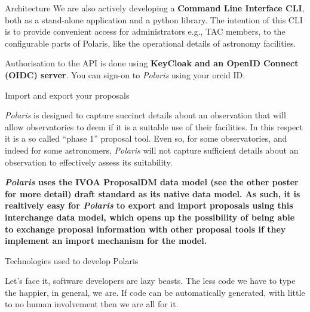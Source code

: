 \documentclass[final]{beamer}
\newlength{\colwidth}
\begin{document}
\begin{frame}[t]
\begin{columns}[t]
\begin{column}{\colwidth}
\begin{block}{Architecture}
                    We are also actively developing a \textbf{Command Line Interface CLI}, both as a stand-alone application and
                    a python library. The intention of this CLI is to provide convenient access
                    for administrators e.g., TAC members, to the configurable parts of Polaris, like the operational
                    details of astronomy facilities.

                    Authorisation to the API is done using \textbf{KeyCloak and an OpenID Connect (OIDC) server}.
                    You can sign-on to \emph{Polaris} using your orcid ID\@.

                \end{block}

                \begin{alertblock}{Import and export your proposals}

                    \emph{Polaris} is designed to capture succinct details about an observation
                    that will allow observatories to deem if it is a suitable use of their facilities.
                    In this respect it is a so called ``phase 1'' proposal tool.
                    Even so, for some observatories, and indeed for some astronomers, \emph{Polaris} will not
                    capture sufficient details about an observation to effectively assess its suitability.

                    \textbf{\emph{Polaris} uses the IVOA ProposalDM data model (see the other poster for more detail)  draft standard as its native data model.
                        As such, it is realtively easy for \emph{Polaris} to export and import proposals using this interchange data model, which opens up
                    the possibility of being able to exchange proposal information with other proposal tools if they implement an import mechanism for the model.
                    }

                \end{alertblock}

                \begin{block}{Technologies used to develop Polaris}

                    Let's face it, software developers are lazy beasts.
                    The less code we have to type the happier, in general, we are.
                    If code can be automatically generated, with little to no human involvement then we are
                    all for it.


\end{block}
\end{column}
\end{columns}
\end{frame}
\end{document}
